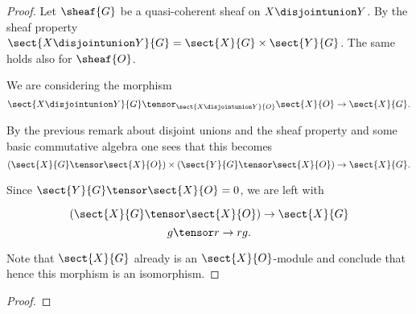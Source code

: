 
\begin{proof}
Let $\sheaf{G}$ be a quasi-coherent sheaf on $X \disjointunion Y$.
By the sheaf property $\sect{X \disjointunion Y}{G} = \sect{X}{G} \times \sect{Y}{G}$.
The same holds also for $\sheaf{O}$.

We are considering the morphism
\[
\sect{X \disjointunion Y}{G} \tensor_{\sect{X \disjointunion Y}{O}} \sect{X}{O} \rightarrow \sect{X}{G}.
\]

By the previous remark about disjoint unions and the sheaf property and some basic commutative algebra one sees that this becomes 
\[
(\sect{X}{G} \tensor \sect{X}{O}) \times (\sect{Y}{G} \tensor \sect{X}{O}) \rightarrow \sect{X}{G}.
\]

Since $\sect{Y}{G} \tensor \sect{X}{O} = 0$, we are left with

\[
(\sect{X}{G} \tensor \sect{X}{O}) \rightarrow \sect{X}{G}
\]
\[
g \tensor r \rightarrow rg.
\]

Note that $\sect{X}{G}$ already is an $\sect{X}{O}$-module and conclude that hence this morphism is an isomorphism.
\end{proof}

\begin{proof}
\end{proof}



